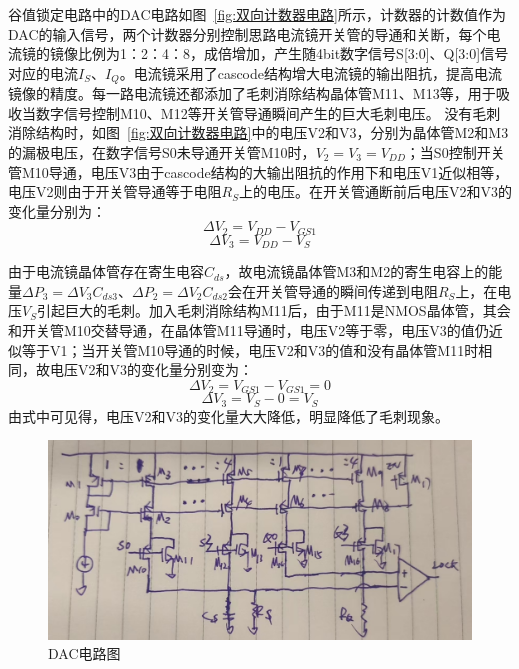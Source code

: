 谷值锁定电路中的DAC电路如图~\ref{fig:双向计数器电路}所示，计数器的计数值作为DAC的输入信号，两个计数器分别控制思路电流镜开关管的导通和关断，每个电流镜的镜像比例为1：2：4：8，成倍增加，产生随4bit数字信号S[3:0]、Q[3:0]信号对应的电流$I_S$、$I_Q$。电流镜采用了cascode结构增大电流镜的输出阻抗，提高电流镜像的精度。每一路电流镜还都添加了毛刺消除结构晶体管M11、M13等，用于吸收当数字信号控制M10、M12等开关管导通瞬间产生的巨大毛刺电压。
没有毛刺消除结构时，如图~\ref{fig:双向计数器电路}中的电压V2和V3，分别为晶体管M2和M3的漏极电压，在数字信号S0未导通开关管M10时，$V_2=V_3=V_{DD}$；当S0控制开关管M10导通，电压V3由于cascode结构的大输出阻抗的作用下和电压V1近似相等，电压V2则由于开关管导通等于电阻$R_S$上的电压。在开关管通断前后电压V2和V3的变化量分别为：
\begin{equation}
    \label{eq:△V2公式}
    \varDelta V_2 = V_{DD} - V_{GS1}
\end{equation}
\begin{equation}
    \label{eq:△V3公式}
    \varDelta V_3 = V_{DD} - V_S
\end{equation}

由于电流镜晶体管存在寄生电容$C_{ds}$，故电流镜晶体管M3和M2的寄生电容上的能量$\varDelta P_3 = \varDelta V_3 C_{ds3}$、$\varDelta P_2 = \varDelta V_2 C_{ds2}$会在开关管导通的瞬间传递到电阻$R_S$上，在电压$V_S$引起巨大的毛刺。加入毛刺消除结构M11后，由于M11是NMOS晶体管，其会和开关管M10交替导通，在晶体管M11导通时，电压V2等于零，电压V3的值仍近似等于V1；当开关管M10导通的时候，电压V2和V3的值和没有晶体管M11时相同，故电压V2和V3的变化量分别变为：
\begin{equation}
    \label{eq:△V2公式1}
    \varDelta V_2 = V_{GS1} - V_{GS1} = 0
\end{equation}
\begin{equation}
    \label{eq:△V3公式1}
    \varDelta V_3 = V_S - 0 = V_S
\end{equation}
由式中可见得，电压V2和V3的变化量大大降低，明显降低了毛刺现象。

\begin{figure}[htbp] 
    \centering
    \includegraphics[width=0.6\linewidth]{figures/DAC电路.jpg}
    \caption{DAC电路图}
    \label{fig:DAC电路}
\end{figure} 

